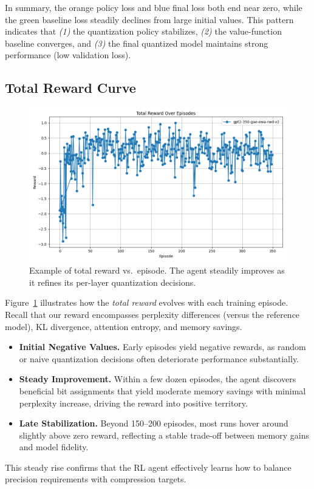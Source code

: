 \documentclass{article}
\begin{document}
	In summary, the orange policy loss and blue final loss both end near zero, while the green baseline loss steadily declines from large initial values. 
	This pattern indicates that \emph{(1)} the quantization policy stabilizes, \emph{(2)} the value-function baseline converges, and \emph{(3)} the final quantized model maintains strong performance (low validation loss). 
		
	\subsection{Total Reward Curve}
	\begin{figure}[ht]
	\centering
	\includegraphics[width=\columnwidth]{gpt2-350-gae-ewa-rwd-v2-reward.png}
	\vspace{-1em}
	\caption{\small Example of total reward vs.\ episode. The agent steadily improves as it refines its per-layer quantization decisions.}
	\label{fig:reward_curves}
	\vspace{-0.2em}
	\end{figure}	
	Figure~\ref{fig:reward_curves} illustrates how the \emph{total reward} evolves with each training episode. Recall that our reward encompasses perplexity differences (versus the reference model), KL divergence, attention entropy, and memory savings. 
	\begin{itemize}
		\item \textbf{Initial Negative Values.} Early episodes yield negative rewards, as random or naive quantization decisions often deteriorate performance substantially.
		\item \textbf{Steady Improvement.} Within a few dozen episodes, the agent discovers beneficial bit assignments that yield moderate memory savings with minimal perplexity increase, driving the reward into positive territory.
		\item \textbf{Late Stabilization.} Beyond 150--200 episodes, most runs hover around slightly above zero reward, reflecting a stable trade-off between memory gains and model fidelity.
	\end{itemize}
	This steady rise confirms that the RL agent effectively learns how to balance precision requirements with compression targets.
	
\end{document}
